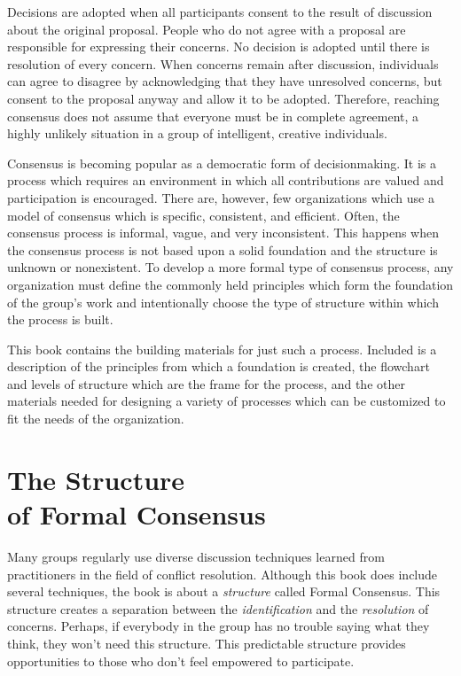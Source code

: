 Decisions are adopted when all participants consent to the result
of discussion about the original proposal. People who do not agree
with a proposal are responsible for expressing their concerns. No
decision is adopted until there is resolution of every
concern. When concerns remain after discussion, individuals can
agree to disagree by acknowledging that they have
unresolved concerns, but consent to the proposal anyway and allow
it to be adopted.  Therefore, reaching consensus does not assume
that everyone must be in complete agreement, a highly unlikely
situation in a group of intelligent, creative individuals.

Consensus is becoming popular as a democratic form of
decisionmaking.  It is a process which requires an environment in
which all contributions are valued and participation is
encouraged. There are, however, few organizations which use a model
of consensus which is specific, consistent, and efficient.  Often,
the consensus process is informal, vague, and very
inconsistent.  This happens when the consensus process is not based
upon a solid foundation and the structure is unknown or
nonexistent. To develop a more formal type of consensus process,
any organization must define the commonly held principles which
form the foundation of the group's work and intentionally choose
the type of structure within which the process is built.

This book contains the building materials for just such a
process. Included is a description of the principles from which a
foundation is created, the flowchart and levels of structure which
are the frame for the process, and the other materials needed for
designing a variety of processes which can be customized to fit the
needs of the organization.

\section[The Structure]{The Structure\\ of Formal Consensus}

Many groups regularly use diverse discussion techniques learned
from practitioners in the field of conflict resolution. Although
this book does include several techniques, the book is about a
\emph{structure} called Formal Consensus.  This structure creates
a separation between the \emph{identification} and the
\emph{resolution} of concerns. Perhaps, if everybody in the group
has no trouble saying what they think, they won't need this
structure. This predictable structure provides opportunities to
those who don't feel empowered to participate.

